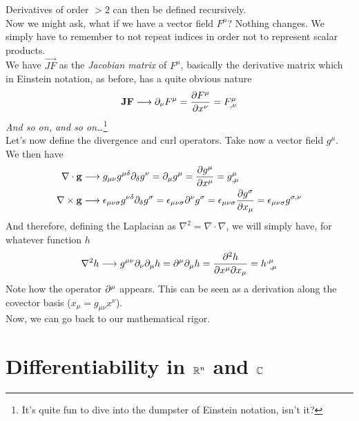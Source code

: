 \documentclass[../complete.tex]{subfiles}
\begin{document}
Derivatives of order $>2$ can then be defined recursively.\\
Now we might ask, what if we have a vector field $F^\mu$? Nothing changes. We simply have to remember to not repeat indices in order not to represent scalar products.\\
We have $\vec{JF}$ as the \textit{Jacobian matrix} of $F^\mu$, basically the derivative matrix which in Einstein notation, as before, has a quite obvious nature
\begin{equation}
	\mathbf{JF}\overset{}{\longrightarrow}\partial_\nu F^\mu=\pdv{F^\mu}{x^\nu}=F^\mu_{,\nu}
	\label{eq:jacobianenot}
\end{equation}
\textit{And so on, and so on\ldots}\footnote{It's quite fun to dive into the dumpster of Einstein notation, isn't it?}\\
Let's now define the divergence and curl operators. Take now a vector field $g^\mu$. We then have
\begin{equation}
	\begin{aligned}
		\nabla\cdot\mathbf{g}&\overset{}{\longrightarrow} g_{\mu\nu}g^{\mu\delta}\partial_\delta g^\nu=\partial_\mu g^\mu=\pdv{g^\mu}{x^\mu}=g^{\mu}_{,\mu}\\
		\nabla\times\mathbf{g}&\overset{}{\longrightarrow} \epsilon_{\mu\nu\sigma}g^{\nu\delta}\partial_\delta g^\sigma=\epsilon_{\mu\nu\sigma}\partial^\nu g^\sigma=\epsilon_{\mu\nu\sigma}\pdv{g^\sigma}{x_\mu}=\epsilon_{\mu\nu\sigma}g^{\sigma,\nu}
	\end{aligned}
	\label{eq:divroten}
\end{equation}
And therefore, defining the Laplacian as $\nabla^2=\nabla\cdot\nabla$, we will simply have, for whatever function $h$
\begin{equation}
	\nabla^2 h\overset{}{\longrightarrow} g^{\mu\nu}\partial_\nu\partial_\mu h=\partial^\mu\partial_\mu h=\pdv[2]{h}{x^\mu}{x_\mu}=h^{,\mu}_{\ ,\mu}
	\label{eq:laplacianen}
\end{equation}
Note how the operator $\partial^\mu$ appears. This can be seen as a derivation along the covector basis ($x_\mu=g_{\mu\nu}x^\nu$).\\
Now, we can go back to our mathematical rigor.\newpage
\section{Differentiability in $\mathbb{R}^n$ and $\mathbb{C}$}
\end{document}
